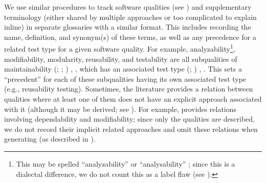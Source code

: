 We use similar procedures to track software qualities \ifnotpaper (see
    ) \fi and supplementary terminology (either shared by
multiple approaches or too complicated to explain inline) in separate
glossaries with a similar format. This includes recording the name, definition,
and synonym(s) of these terms, as well as any precedence for a related test
type for a given software quality. For example, analyzability\footnote{
    This may be spelled ``analyzability'' \citep[p.~18]{IEEE2017} or
    ``analysability'' \citep{ISO_IEC2023a}; since this is a dialectal
    difference, we do not count this as a label flaw (see
    ).}, modifiability, modularity, reusability, and
testability are all subqualities of maintainability \ifnotpaper
    (\citealp{ISO_IEC2023a}; \citealp[Tab.~A.1]{IEEE2021};
    \citealp[p.~7\=/10]{SWEBOK2024}) \else
    \cite[p.~7\=/10]{SWEBOK2024}, \cite[Tab.~A.1]{IEEE2021},
    \cite{ISO_IEC2023a} \fi which has an associated test type
\ifnotpaper
    (\citealp[pp.~5, 22]{IEEE2022}; \citeyear[p.~38, Tab.~A.1]{IEEE2021})\else
    \cite[pp.~5, 22]{IEEE2022}, \cite[p.~38, Tab.~A.1]{IEEE2021}\fi. This sets
a ``precedent'' for each of these subqualities having its own associated test
type (e.g., reusability testing). \ifnotpaper
    Sometimes, the literature provides a relation between qualities where at
    least one of them does not have an explicit approach associated with it
    (although it may be derived; see ). For example,
    \citet{ISO_IEC2023a} provides relations involving dependability and
    modifiability; since only the qualities are described, we do not record
    their implicit related approaches and omit these relations when generating
    \recFigs{} (as described in ).\fi

